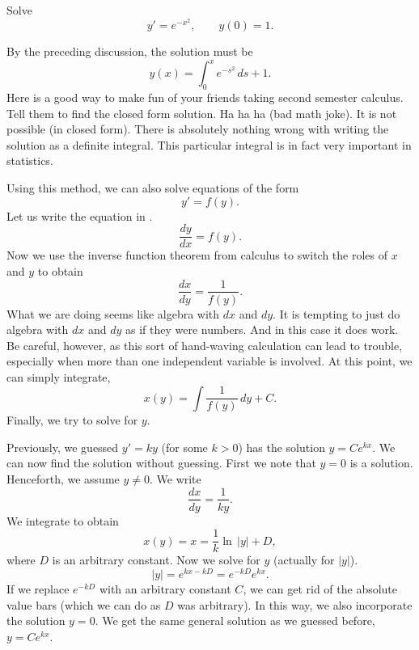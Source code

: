 \begin{example}
Solve
\begin{equation*}
y' = e^{-x^2}, \qquad y(0) = 1 .
\end{equation*}

By the preceding discussion, the solution must be
\begin{equation*}
y(x) = \int_0^x e^{-s^2} \,ds + 1 .
\end{equation*}
Here is a good way to make fun of your friends taking second semester
calculus.  Tell them to
find the closed form solution.  Ha ha ha (bad math joke).  It is
not possible (in closed form).
There is absolutely nothing wrong with writing the solution as a
definite integral.
This particular integral
is in fact very important
in statistics.
\end{example}

Using this method, we can also solve equations of the form
\begin{equation*}
y' = f(y) .
\end{equation*}
Let us write the equation in .
\begin{equation*}
\frac{dy}{dx} = f(y) .
\end{equation*}
Now we use the inverse function theorem from calculus
to switch the roles of $x$ and $y$
to obtain
\begin{equation*}
\frac{dx}{dy} = \frac{1}{f(y)} .
\end{equation*}
What
we are doing seems like algebra with $dx$ and $dy$.
It is tempting to just do algebra with $dx$
and $dy$ as if they were numbers.  And in this case it does work.  Be
careful,
however, as this sort of hand-waving calculation can lead to trouble,
especially when
more than one independent variable is involved.
At this point, we can simply integrate,
\begin{equation*}
x(y) = \int \frac{1}{f(y)} \,dy + C .
\end{equation*}
Finally, we try to solve for $y$.

\begin{example}
Previously, we guessed $y' = ky$ (for some $k > 0$) has the solution
$y=Ce^{kx}$.  We can now find the solution without guessing.
First we note that $y=0$ is a solution.
Henceforth, we assume $y\not= 0$.  We write
\begin{equation*}
\frac{dx}{dy} = \frac{1}{ky} .
\end{equation*}
We integrate to obtain
\begin{equation*}
x(y) = x = \frac{1}{k} \ln \, \lvert y \rvert + D,
\end{equation*}
where $D$ is an arbitrary constant.
Now we solve for $y$ (actually for $\lvert y \rvert$).
\begin{equation*}
\lvert y \rvert =
e^{kx-kD} = 
e^{-kD} e^{k x} .
\end{equation*}
If we replace $e^{-kD}$ with an arbitrary constant $C$, we can
get rid of the absolute value bars (which we can do as $D$ was arbitrary).  In
this way, we
also incorporate the solution $y=0$.  We get the same general solution as
we guessed before, $y = Ce^{kx}$.
\end{example}


